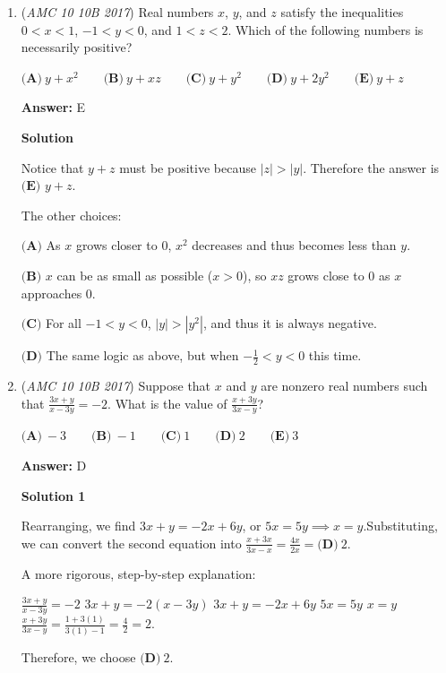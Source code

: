 \begin{enumerate}
 


	\item (\textit{AMC 10 10B 2017}) Real numbers $x$, $y$, and $z$ satisfy the inequalities
$0<x<1$, $-1<y<0$, and $1<z<2$.
Which of the following numbers is necessarily positive?


 $\textbf{(A)}\ y+x^2\qquad\textbf{(B)}\ y+xz\qquad\textbf{(C)}\ y+y^2\qquad\textbf{(D)}\ y+2y^2\qquad\textbf{(E)}\ y+z$

 \textbf{Answer: }E



\textbf{Solution}

Notice that $y+z$ must be positive because $|z|>|y|$. Therefore the answer is $\boxed{\textbf{(E) } y+z}$.

 The other choices:

 $\textbf{(A)}$ As $x$ grows closer to $0$, $x^2$ decreases and thus becomes less than $y$.

 $\textbf{(B)}$ $x$ can be as small as possible ($x>0$), so $xz$ grows close to $0$ as $x$ approaches $0$.

 $\textbf{(C)}$ For all $-1<y<0$, $|y|>|y^2|$, and thus it is always negative.

 $\textbf{(D)}$ The same logic as above, but when $-\frac{1}{2}<y<0$ this time.

 


	\item (\textit{AMC 10 10B 2017}) Suppose that $x$ and $y$ are nonzero real numbers such that $\frac{3x+y}{x-3y}=-2$. What is the value of $\frac{x+3y}{3x-y}$?


 $\textbf{(A)}\ -3\qquad\textbf{(B)}\ -1\qquad\textbf{(C)}\ 1\qquad\textbf{(D)}\ 2\qquad\textbf{(E)}\ 3$

 \textbf{Answer: }D



\textbf{Solution 1}

Rearranging, we find $3x+y=-2x+6y$, or $5x=5y\implies x=y$.Substituting, we can convert the second equation into $\frac{x+3x}{3x-x}=\frac{4x}{2x}=\boxed{\textbf{(D)}\ 2}$.

 


 A more rigorous, step-by-step explanation:

 $\frac{3x+y}{x-3y}=-2$
$3x+y=-2\left(x-3y\right)$
$3x+y=-2x+6y$
$5x=5y$
$x=y$
$\frac{x+3y}{3x-y}=\frac{1+3\left(1\right)}{3\left(1\right)-1}=\frac{4}{2}=2$.

 Therefore, we choose $\boxed{\textbf{(D)}\ 2}$.

 




\end{enumerate}
